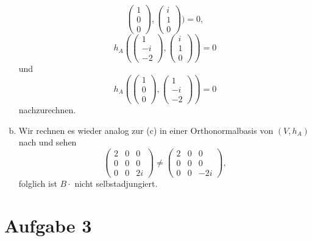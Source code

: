 \documentclass{article}
\theoremstyle{definition}
\begin{document}
\begin{enumerate}[(a)]
$$\begin{pmatrix}
		1\\ 0 \\ 0
	\end{pmatrix}, \begin{pmatrix}
		i\\1\\0
	\end{pmatrix}) = 0,$$ $$h_A(\begin{pmatrix}
		1\\ -i\\ -2
	\end{pmatrix}, \begin{pmatrix}
		i\\1\\0
	\end{pmatrix}) = 0$$ und $$h_A(\begin{pmatrix}
		1\\ 0 \\ 0
	\end{pmatrix}, \begin{pmatrix}
		1\\ -i\\ -2
	\end{pmatrix}) = 0$$ nachzurechnen.
	\item Wir rechnen es wieder analog zur (c) in einer Orthonormalbasis von $(V, h_A)$ nach und sehen
	$$\begin{pmatrix}
		2 & 0 & 0\\
		0 & 0 & 0\\
		0 & 0 & 2i
	\end{pmatrix} \neq \begin{pmatrix}
		2 & 0 & 0\\
		0 & 0 & 0\\
		0 & 0 & -2i
	\end{pmatrix}, $$ folglich ist $B\cdot $ nicht selbstadjungiert.
\end{enumerate}
\section{Aufgabe 3} 
\end{document}
